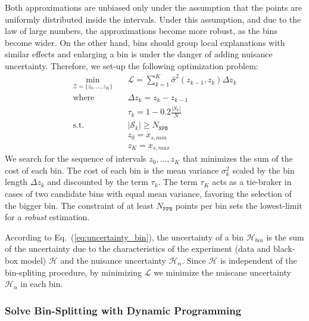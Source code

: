 \documentclass[twoside]{article}
\begin{document}
Both approximations are unbiased only under the assumption that the
points are uniformly distributed inside the intervals. Under this
assumption, and due to the law of large numbers, the approximations
become more robust, as the bins become wider. On the other hand, bins
should group local explanations with similar effects and enlarging a
bin is under the danger of adding nuisance uncertainty. Therefore, we
set-up the following optimization problem:
\begin{equation}
  \label{eq:opt}
\begin{aligned}
  \min_{ \mathcal{Z} = \{z_0, \ldots, z_K\}} \quad & \mathcal{L} = \sum_{k=1}^K \hat{\sigma}^2(z_{k-1}, z_k) \Delta z_k \\
  \textrm{where} \quad & \Delta z_k = z_k - z_{k-1} \\
  & \tau_k = 1 - 0.2 \frac{|S_k|}{N} \\
  \textrm{s.t.} \quad & |\mathcal{S}_k| \geq N_{\mathtt{NPB}}\\
                                     & z_0 = x_{s,min}\\
                                     & z_K = x_{s, max}
\end{aligned}
\end{equation}
%
We search for the sequence of intervals \(z_0, \ldots, z_K\) that
minimizes the sum of the cost of each bin. The cost of each bin is the
mean variance \(\sigma^2_k\) scaled by the bin length \(\Delta z_k\)
and discounted by the term \(\tau_k\). The term \(\tau_K\) acts as a
tie-braker in cases of two candidate bins with equal mean variance,
favoring the selection of the bigger bin. The constraint of at least
\(N_{\mathtt{PPB}}\) points per bin sets the lowest-limit for a
\textit{robust} estimation.

According to Eq.~(\ref{eq:uncertainty_bin}), the uncertainty of a bin
\(\mathcal{H}_{bin}\) is the sum of the uncertainty due to the
characteristics of the experiment (data and black-box model)
\(\mathcal{H}\) and the nuisance uncertainty \(\mathcal{H}_n\). Since
\(\mathcal{H}\) is independent of the bin-spliting procedure, by
minimizing \(\mathcal{L}\) we minimize the nuiscane uncertainty
\(\mathcal{H}_n\) in each bin.

\subsubsection{Solve Bin-Splitting with Dynamic Programming}
\label{sec:dynamic-programing}
\end{document}
